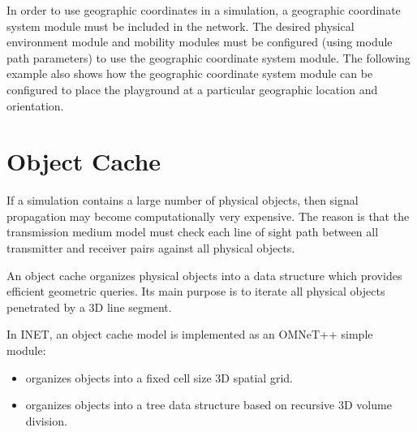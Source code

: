 In order to use geographic coordinates in a simulation, a geographic
coordinate system module must be included in the network. The desired
physical environment module and mobility modules must be configured (using
module path parameters) to use the geographic coordinate system module. The
following example also shows how the geographic coordinate system module
can be configured to place the playground at a particular geographic
location and orientation.


\section{Object Cache}
\label{sec:environment:object-cache}

If a simulation contains a large number of physical objects, then signal
propagation may become computationally very expensive. The reason is that
the transmission medium model must check each line of sight path between
all transmitter and receiver pairs against all physical objects.

An object cache organizes physical objects into a data structure which provides
efficient geometric queries. Its main purpose is to iterate all physical objects
penetrated by a 3D line segment.

In INET, an object cache model is implemented as an OMNeT++ simple module:

\begin{itemize}
    \item {} organizes objects into a fixed cell size 3D spatial grid.
    \item {} organizes objects into a tree data structure based on recursive 3D volume division.
\end{itemize}






